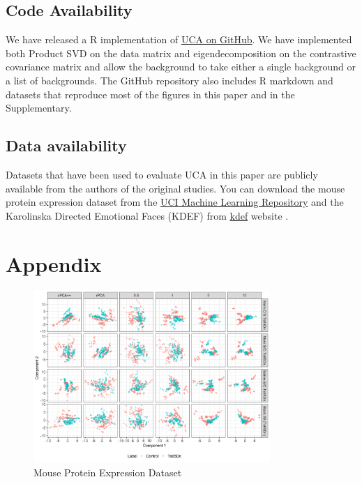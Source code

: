 \documentclass[12pt]{article}
\begin{document}
\subsection{Code Availability}
We have released a R implementation of \href{https://github.com/rtud2/Residual-Dimension-Reduction/tree/master/uca}{UCA on GitHub}. We have implemented both Product SVD on the data matrix and eigendecomposition on the contrastive covariance matrix and allow the background to take either a single background or a list of backgrounds. The GitHub repository also includes R markdown and datasets that reproduce most of the figures in this paper and in the Supplementary.

\subsection{Data availability}
Datasets that have been used to evaluate UCA in this paper are publicly available from the authors of the original studies. You can download the mouse protein expression dataset from the \href{https://archive.ics.uci.edu/ml/datasets/Mice+Protein+Expression}{UCI Machine Learning Repository} \cite{Higuera} and the Karolinska Directed Emotional Faces (KDEF) from \href{https://kdef.se/}{kdef} website  \cite{Calvo2008}.





\section{Appendix}
\begin{figure}[!ht]
  \centering
  \includegraphics[width = 0.8\textwidth]{figure/Mouse_stack_cpc_rpcTs65Dn.png}
  \caption{Mouse Protein Expression Dataset}
  \label{fig:mouse_stack_cpca}
\end{figure}


\end{document}
